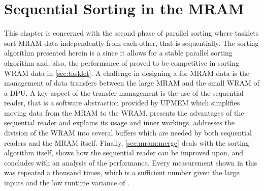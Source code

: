 \chapter{Sequential Sorting in the MRAM}
\label{sec:mram}

This chapter is concerned with the second phase of parallel sorting where tasklets sort MRAM data independently from each other, that is sequentially.
The sorting algorithm presented herein is a \MS{} since it allows for a stable parallel sorting algorithm and, also, the performance of \MS{} proved to be competitive in sorting WRAM data in \cref{sec:tasklet}.
A challenge in designing a \MS{} for MRAM data is the management of data transfers between the large MRAM and the small WRAM of a DPU.
A key aspect of the transfer management is the use of the sequential reader, that is a software abstraction provided by UPMEM which simplifies moving data from the MRAM to the WRAM.
 presents the advantages of the sequential reader and explains its usage and inner workings.
 addresses the division of the WRAM into several buffers which are needed by both sequential readers and the MRAM \MS{} itself.
Finally, \cref{sec:mram:merge} deals with the sorting algorithm itself, shows how the sequential reader can be improved upon, and concludes with an analysis of the performance.
Every measurement shown in this  was repeated a thousand times, which is a sufficient number given the large inputs and the low runtime variance of \MS{}.

%
%
%

\clearpage


\clearpage


\clearpage

